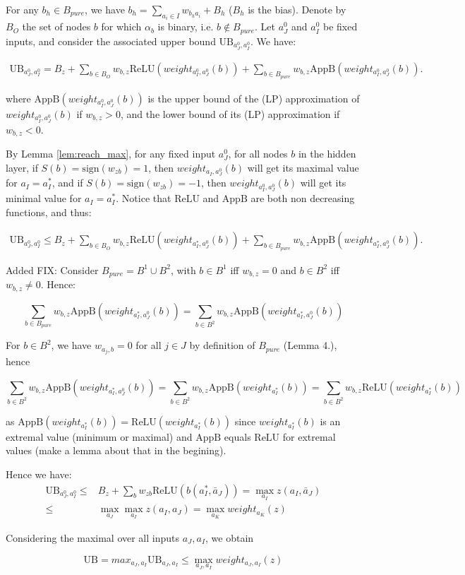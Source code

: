 \documentclass[]{article}
\theoremstyle{definition}
\newcommand{\ReLU}{\mathrm{ReLU}}
\begin{document}
For any $b_h\in B_{pure}$, we have $b_h=\sum_{a_i\in I}w_{b_ha_i}+B_h$ ($B_h$ is the bias). 
Denote by $B_O$ the set of nodes $b$ for which $\alpha_b$ is binary, i.e. 
$b \notin B_{pure}$. %
Let $a^0_J$ and $a^0_I$ be fixed inputs, and consider the associated upper bound 
$\mathrm{UB}_{a^0_J,a^0_I}$. We have:

\begin{align*}
	\mathrm{UB}_{a^0_J,a^0_I} = B_z + \sum_{b\in B_O} w_{b,z}\ReLU(weight_{a^0_I,a^0_J}(b)) + \sum_{b\in B_{pure}} w_{b,z} \mathrm{AppB}(weight_{a^0_I,a^0_J}(b)).
\end{align*} 

where $\mathrm{AppB}(weight_{a^0_I,a^0_J}(b))$ is the upper bound of 
the (LP) approximation of $weight_{a^0_I,a^0_J}(b)$ if $w_{b,z}>0$, and the lower bound
of its (LP) approximation if $w_{b,z}<0$. 

By Lemma \ref{lem:reach_max}, for any fixed input $a^0_J$, for all nodes $b$ in the hidden layer, if $S(b)=\mathrm{sign}(w_{zb})=1$, then 
$weight_{a_I,a^0_J}(b)$ will get its maximal value for $a_I=a_I^*$,
and if $S(b)=\mathrm{sign}(w_{zb})=-1$, then $weight_{a^0_I,a^0_J}(b)$ will get its minimal value for $a_I=a_I^*$.
Notice that $\mathrm{ReLU}$ and $\mathrm{AppB}$ are both non decreasing functions, and thus:

\begin{align*}
	\mathrm{UB}_{a^0_J,a^0_I} \leq B_z + \sum_{b\in B_O} w_{b,z}\ReLU(weight_{a^*_I,a^0_J}(b)) +
	\sum_{b\in B_{pure}} w_{b,z} \mathrm{AppB}(weight_{a^*_I,a^0_J}(b)).
\end{align*} 

Added FIX:
Consider $B_{pure}=B^1 \cup B^2$, with $b \in B^1$ iff
$w_{b,z} = 0$ and $b \in B^2$ iff $w_{b,z} \neq 0$.
Hence:

$$\sum_{b\in B_{pure}} w_{b,z} \mathrm{AppB}(weight_{a^*_I,a^0_J}(b)) = 
\sum_{b\in B^2} w_{b,z} \mathrm{AppB}(weight_{a^*_I,a^0_J}(b))$$

For $b \in B^2$, we have $w_{a_j,b}=0$ for all $j \in J$
by definition of $B_{pure}$ (Lemma 4.), hence

$$\sum_{b\in B^2} w_{b,z} \mathrm{AppB}(weight_{a^*_I,a^0_J}(b)) = 
\sum_{b\in B^2} w_{b,z} \mathrm{AppB}(weight_{a^*_I}(b))
=\sum_{b\in B^2} w_{b,z} \mathrm{ReLU}(weight_{a^*_I}(b))
$$

as $\mathrm{AppB}(weight_{a^*_I}(b))=\mathrm{ReLU}(weight_{a^*_I}(b))$ since 
$weight_{a^*_I}(b)$ is an extremal value (minimum or maximal) and 
$\mathrm{AppB}$ equals $\mathrm{ReLU}$ for extremal values (make a lemma about that in the begining).

Hence we have: \begin{align*}
	\mathrm{UB}_{a^0_J,a^0_I}  \leq & B_z+\sum_{b}w_{zb}\ReLU(b(a_I^*,\bar{a}_J))
	= \max_{a_I} z(a_I,\bar{a}_J) \\
	\leq & \max_{a_J}\max_{a_I} z(a_I,a_J) 	= \max_{a_K} weight_{a_K}(z)
\end{align*}

Considering the maximal over all inputs $a_J,a_I$, we obtain 

$$\mathrm{UB} = max_{a_J,a_I} \mathrm{UB}_{a_J,a_I} \leq \max_{a_J,a_I} weight_{a_J,a_I}(z)$$
\end{document}
